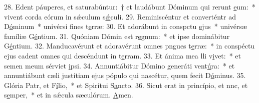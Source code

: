 28. Edent páuperes, et saturabúntur:~† et laudábunt Dóminum qui rerunt \uline{e}um:~* vivent corda eórum in sǽculum s\uline{ǽ}culi.
29. Reminiscéntur et converténtr ad D\uline{ó}minum~* univérsi fines t\uline{e}rræ:
30. Et adorábunt in conspctu \uline{e}jus~* univérsæ famíliæ G\uline{é}ntium.
31. Quóniam Dómin est r\uline{e}gnum:~* et ipse dominábitur G\uline{é}ntium.
32. Manducavérunt et adoravérunt omnes pngues t\uline{e}rræ:~* in conspéctu ejus cadent omnes qui descéndunt in t\uline{e}rram.
33. Et ánima mea lli v\uline{i}vet:~* et semen meum sérviet \uline{i}psi.
34. Annuntiábitur Dómino generáti vent\uline{ú}ra:~* et annuntiábunt cæli justítiam ejus pópulo qui nascétur, quem fecit D\uline{ó}minus.
35. Glória Patr, et F\uline{í}lio,~* et Spirítui S\uline{a}ncto.
36. Sicut erat in princípio, et nnc, et s\uline{e}mper,~* et in sǽcula sæculórum. \uline{A}men.
